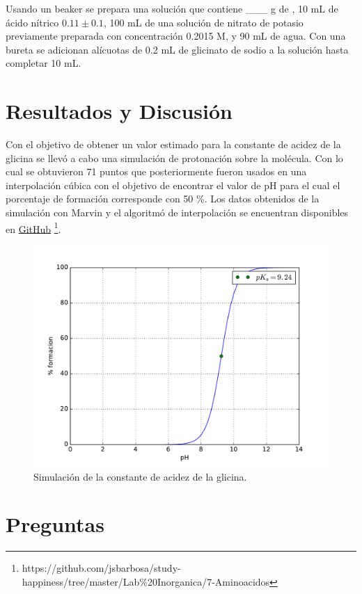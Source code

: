 \documentclass[fleqn,10pt]{SelfArx} %
\begin{document}
	Usando un beaker se prepara una soluci\'on que contiene \_\_\_ g de , 10 mL de \'acido n\'itrico $0.11\pm0.1$, 100 mL de una soluci\'on de nitrato de potasio previamente preparada con concentraci\'on 0.2015 M, y 90 mL de agua. Con una bureta se adicionan al\'icuotas de 0.2 mL de glicinato de sodio a la soluci\'on hasta completar 10 mL.
		
	\section{Resultados y Discusi\'on}
	Con el objetivo de obtener un valor estimado para la constante de acidez de la glicina se llev\'o a cabo una simulaci\'on de protonaci\'on sobre la mol\'ecula. Con lo cual se obtuvieron 71 puntos que posteriormente fueron usados en una interpolaci\'on c\'ubica con el objetivo de encontrar el valor de pH para el cual el porcentaje de formaci\'on corresponde con 50 \%. Los datos obtenidos de la simulaci\'on con Marvin y el algoritm\'o de interpolaci\'on se encuentran disponibles en \href{https://github.com/jsbarbosa/study-happiness/tree/master/Lab\%20Inorganica/7-Aminoacidos}{\color{blue}GitHub} \footnote{https://github.com/jsbarbosa/study- happiness/tree/master/Lab\%20Inorganica/7-Aminoacidos}.
	\begin{figure}[h]
		\centering
		\includegraphics[width=\linewidth]{images/pka_sim.pdf}
		\caption{Simulaci\'on de la constante de acidez de la glicina.}
	\end{figure}
	
	\section{Preguntas}
\end{document}
